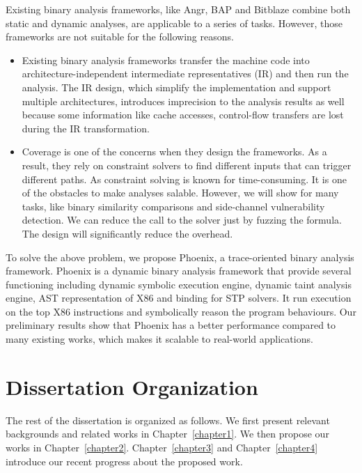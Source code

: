 Existing binary analysis frameworks, like Angr, BAP and Bitblaze combine both static
and dynamic analyses, are applicable to a series of tasks. However, those frameworks
are not suitable for the following reasons. 
\begin{itemize}
    \item Existing binary analysis frameworks transfer the machine code into
    architecture-independent intermediate representatives (IR) and then run the
    analysis. The IR design, which simplify the implementation and support multiple
    architectures, introduces imprecision to the analysis results as well because some
    information like cache accesses, control-flow transfers are lost during the IR
    transformation.
    \item Coverage is one of the concerns when they design the frameworks. 
    As a result, they rely on constraint solvers to find different inputs that can
    trigger different paths. As constraint solving is known for time-consuming. It is
    one of the obstacles to make analyses salable.
    However, we will show for many tasks, like binary similarity comparisons and side-channel vulnerability detection. We can
    reduce the call to the solver just by fuzzing the formula. The design will
    significantly reduce the overhead.
\end{itemize}
To solve the above problem, we propose Phoenix, a trace-oriented binary analysis
framework. Phoenix is a dynamic binary analysis framework that provide several 
functioning including dynamic symbolic execution engine, dynamic taint analysis
engine, AST representation of X86 and binding for STP solvers. It run 
execution on the top X86 instructions and symbolically reason the program behaviours.
Our preliminary results show that Phoenix has a better performance compared to 
many existing works, which makes it scalable to real-world applications.




\section{Dissertation Organization}
The rest of the dissertation is organized as follows. We first present relevant backgrounds and related works in Chapter~\ref{chapter1}. We then propose our works in
Chapter~\ref{chapter2}. Chapter~\ref{chapter3} and Chapter~\ref{chapter4} introduce
our recent progress about the proposed work. 
